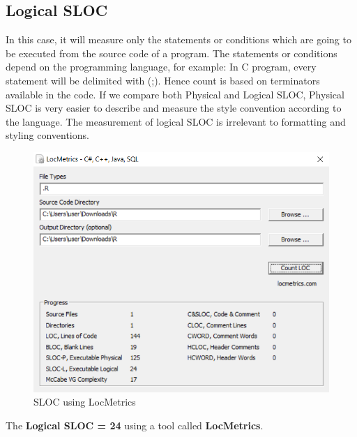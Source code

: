 \documentclass[a4paper, 11pt]{article}
\begin{document}
\subsection{Logical SLOC}
In this case, it will measure only the statements or conditions which are going to be executed from the source code of a program. The statements or conditions depend on the programming language, for example: In C program, every statement will be delimited with (;).
Hence count is based on terminators available in the code. If we compare both Physical and Logical SLOC, Physical SLOC is very easier to describe and measure the style convention according to the language. The measurement of logical SLOC is irrelevant to formatting and styling conventions.
\begin{figure}[H]
		\begin{center}
		\includegraphics[width=\columnwidth]{LOC.PNG}
		\caption{SLOC using LocMetrics}
		\label{fig:figure}
		\end{center}
	\end{figure}
The \textbf{Logical SLOC = 24} using a tool called \textbf{LocMetrics}.\\
\end{document}
